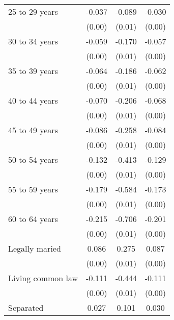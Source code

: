 {\begin{tabular}{l*{3}{c}}
25 to 29 years      &      -0.037\sym{***}&      -0.089\sym{***}&      -0.030\sym{***}\\
                    &      (0.00)         &      (0.01)         &      (0.00)         \\
30 to 34 years      &      -0.059\sym{***}&      -0.170\sym{***}&      -0.057\sym{***}\\
                    &      (0.00)         &      (0.01)         &      (0.00)         \\
35 to 39 years      &      -0.064\sym{***}&      -0.186\sym{***}&      -0.062\sym{***}\\
                    &      (0.00)         &      (0.01)         &      (0.00)         \\
40 to 44 years      &      -0.070\sym{***}&      -0.206\sym{***}&      -0.068\sym{***}\\
                    &      (0.00)         &      (0.01)         &      (0.00)         \\
45 to 49 years      &      -0.086\sym{***}&      -0.258\sym{***}&      -0.084\sym{***}\\
                    &      (0.00)         &      (0.01)         &      (0.00)         \\
50 to 54 years      &      -0.132\sym{***}&      -0.413\sym{***}&      -0.129\sym{***}\\
                    &      (0.00)         &      (0.01)         &      (0.00)         \\
55 to 59 years      &      -0.179\sym{***}&      -0.584\sym{***}&      -0.173\sym{***}\\
                    &      (0.00)         &      (0.01)         &      (0.00)         \\
60 to 64 years      &      -0.215\sym{***}&      -0.706\sym{***}&      -0.201\sym{***}\\
                    &      (0.00)         &      (0.01)         &      (0.00)         \\
Legally maried      &       0.086\sym{***}&       0.275\sym{***}&       0.087\sym{***}\\
                    &      (0.00)         &      (0.01)         &      (0.00)         \\
Living common law   &      -0.111\sym{***}&      -0.444\sym{***}&      -0.111\sym{***}\\
                    &      (0.00)         &      (0.01)         &      (0.00)         \\
Separated           &       0.027\sym{***}&       0.101\sym{***}&       0.030\sym{***}\\

\end{tabular}}
